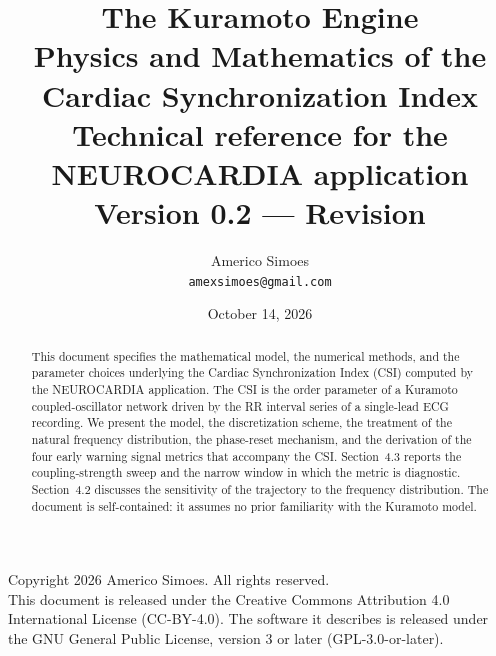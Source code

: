 \documentclass[11pt]{article}
\title{\textbf{The Kuramoto Engine}\\[4pt]
\large Physics and Mathematics of the Cardiac Synchronization Index\\[2pt]
\normalsize Technical reference for the NEUROCARDIA application\\[2pt]
\small Version 0.2 --- Revision}
\author{Americo Simoes \\ \texttt{amexsimoes@gmail.com}}
\date{October 14, 2026}
\begin{document}
\maketitle

\begin{center}
\small
Copyright \textcopyright{} 2026 Americo Simoes. All rights reserved.\\
This document is released under the Creative Commons Attribution 4.0
International License (CC-BY-4.0). The software it describes is released
under the GNU General Public License, version 3 or later (GPL-3.0-or-later).
\end{center}

\vspace{1em}
\noindent{}

\vspace{1em}

\begin{abstract}
This document specifies the mathematical model, the numerical methods,
and the parameter choices underlying the Cardiac Synchronization Index
(CSI) computed by the NEUROCARDIA application. The CSI is the order
parameter of a Kuramoto coupled-oscillator network driven by the RR
interval series of a single-lead ECG recording. We present the model,
the discretization scheme, the treatment of the natural frequency
distribution, the phase-reset mechanism, and the derivation of the four
early warning signal metrics that accompany the CSI. Section~4.3 reports
the coupling-strength sweep and the narrow window in which the metric is
diagnostic. Section~4.2 discusses the sensitivity of the trajectory to
the frequency distribution. The document is self-contained: it assumes
no prior familiarity with the Kuramoto model.
\end{abstract}

\tableofcontents
\end{document}
